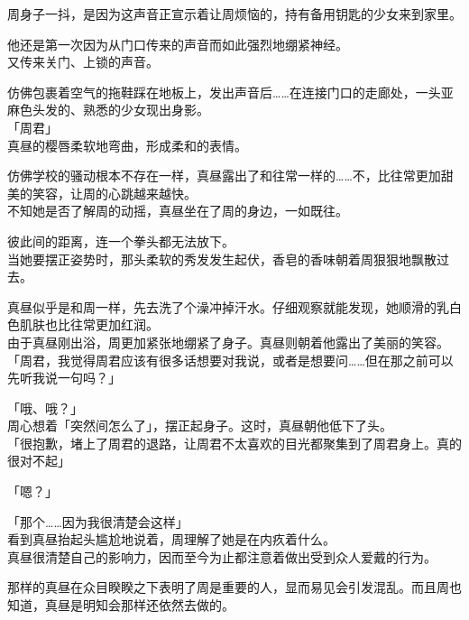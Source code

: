 周身子一抖，是因为这声音正宣示着让周烦恼的，持有备用钥匙的少女来到家里。

他还是第一次因为从门口传来的声音而如此强烈地绷紧神经。\\

又传来关门、上锁的声音。

仿佛包裹着空气的拖鞋踩在地板上，发出声音后……在连接门口的走廊处，一头亚麻色头发的、熟悉的少女现出身影。\\

「周君」\\

真昼的樱唇柔软地弯曲，形成柔和的表情。

仿佛学校的骚动根本不存在一样，真昼露出了和往常一样的……不，比往常更加甜美的笑容，让周的心跳越来越快。\\

不知她是否了解周的动摇，真昼坐在了周的身边，一如既往。

彼此间的距离，连一个拳头都无法放下。\\

当她要摆正姿势时，那头柔软的秀发发生起伏，香皂的香味朝着周狠狠地飘散过去。

真昼似乎是和周一样，先去洗了个澡冲掉汗水。仔细观察就能发现，她顺滑的乳白色肌肤也比往常更加红润。\\

由于真昼刚出浴，周更加紧张地绷紧了身子。真昼则朝着他露出了美丽的笑容。\\

「周君，我觉得周君应该有很多话想要对我说，或者是想要问……但在那之前可以先听我说一句吗？」

「哦、哦？」\\

周心想着「突然间怎么了」，摆正起身子。这时，真昼朝他低下了头。\\

「很抱歉，堵上了周君的退路，让周君不太喜欢的目光都聚集到了周君身上。真的很对不起」

「嗯？」

「那个……因为我很清楚会这样」\\

看到真昼抬起头尴尬地说着，周理解了她是在内疚着什么。\\

真昼很清楚自己的影响力，因而至今为止都注意着做出受到众人爱戴的行为。

那样的真昼在众目睽睽之下表明了周是重要的人，显而易见会引发混乱。而且周也知道，真昼是明知会那样还依然去做的。\\

